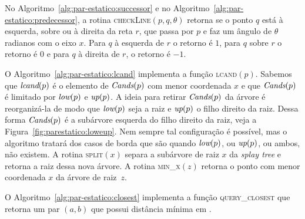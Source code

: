 No Algoritmo~\ref{alg:par-estatico:successor} e no Algoritmo~\ref{alg:par-estatico:predecessor}, a
rotina \textsc{checkLine}$(p, q, \theta)$ retorna se o ponto $q$ está à esquerda, sobre ou à
direita da reta $r$, que passa por $p$ e faz um ângulo de $\theta$ radianos com o eixo $x$.
Para $q$ à esquerda de $r$ o retorno é $1$, para $q$ sobre $r$ o retorno é $0$ e para $q$ à
direita de $r$, o retorno é $-1$.





O Algoritmo~\ref{alg:par-estatico:lcand} implementa a função \textsc{lcand}$(p)$.
Sabemos que $\textit{lcand}(p)$ é o elemento de $\textit{Cands}(p)$ com menor coordenada $x$ e que $\textit{Cands}(p)$ é
limitado por $\textit{low}(p)$ e $\textit{up}(p)$.
A ideia para retirar $\textit{Cands}(p)$ da árvore é reorganizá-la de modo que $\textit{low}(p)$ seja a raiz e
$\textit{up}(p)$ o filho direito da raiz.
Dessa forma $\textit{Cands}(p)$ é a subárvore esquerda do filho direito da raiz, veja a
Figura~\ref{fig:parestatico:loweup}.
Nem sempre tal configuração é possível, mas o algoritmo tratará dos casos de borda que são quando
$\textit{low}(p)$, ou $\textit{up}(p)$, ou ambos, não existem.
A rotina \textsc{split}$(x)$ separa a subárvore de raiz $x$ da \textit{splay tree} e retorna a
raiz dessa nova árvore.
A rotina \textsc{min\_x}$(z)$ retorna o ponto com menor coordenada $x$ da árvore de raiz~$z$.





O Algoritmo~\ref{alg:par-estatico:closest} implementa a função \textsc{query\_closest} que retorna
um par $(a,b)$ que possui distância mínima em \pontos.


